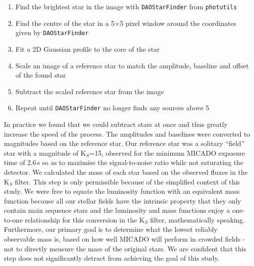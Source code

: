 \begin{enumerate}
    \item Find the brightest star in the image with \verb+DAOStarFinder+ from \verb+photutils+ \citep{photutils}
    \item Find the centre of the star in a 5$\times$5 pixel window around the coordinates given by \verb+DAOStarFinder+
    \item Fit a 2D Gaussian profile to the core of the star
    \item Scale an image of a reference star to match the amplitude, baseline and offset of the found star
    \item Subtract the scaled reference star from the image
    \item Repeat until \verb+DAOStarFinder+ no longer finds any sources above 5\,\sig
\end{enumerate}

In practice we found that we could subtract  stars at once and thus greatly increase the speed of the process. 
The amplitudes and baselines were converted to magnitudes based on the reference star. 
Our reference star was a solitary ``field'' star with a magnitude of K$_S$=15, observed for the minimum {MICADO} exposure time of 2.6\,s so as to maximise the signal-to-noise ratio while not saturating the detector. 
We calculated the mass of each star based on the observed fluxes in the K$_S$ filter. 
This step is only permissible because of the simplified context of this study. 
We were free to equate the luminosity function with an equivalent mass function because all our stellar fields have the intrinsic property that they only contain main sequence stars and the luminosity and mass functions enjoy a one-to-one relationship for this conversion in the K$_S$ filter, mathematically speaking. 
Furthermore, our primary goal is to determine what the lowest reliably observable mass is, based on how well MICADO will perform in crowded fields - not to directly measure the mass of the original stars. 
We are confident that this step does not significantly detract from achieving the goal of this study\correct.



